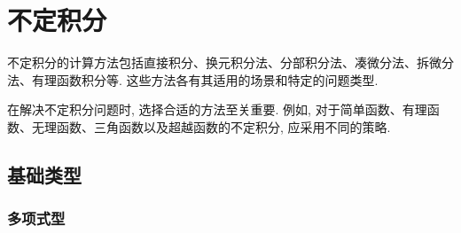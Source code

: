 \section{不定积分}

不定积分的计算方法包括直接积分、换元积分法、分部积分法、凑微分法、拆微分法、有理函数积分等. 这些方法各有其适用的场景和特定的问题类型.

在解决不定积分问题时, 选择合适的方法至关重要. 例如, 对于简单函数、有理函数、无理函数、三角函数以及超越函数的不定积分, 应采用不同的策略.

% 
% 
% 

\subsection{基础类型}

\subsubsection{多项式型}

